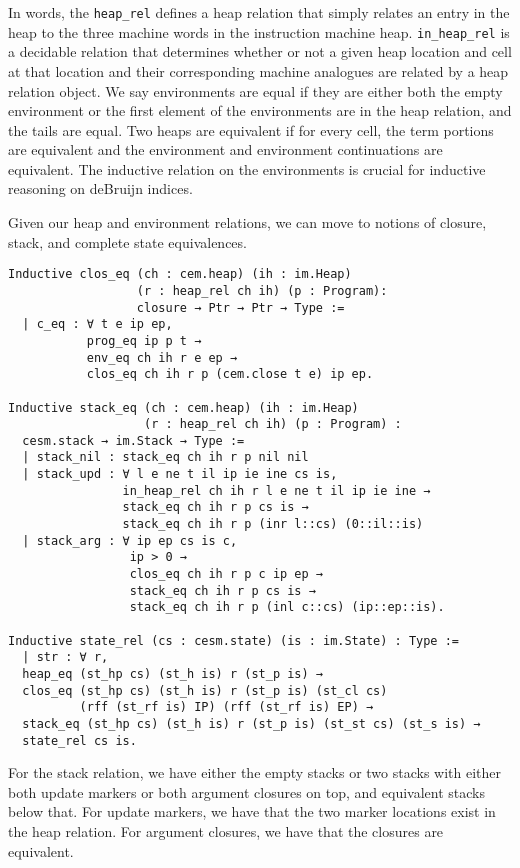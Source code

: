 In words, the \texttt{heap\_rel} defines a heap relation that simply relates an
entry in the \ce heap to the three machine words in the instruction machine
heap. \texttt{in\_heap\_rel} is a decidable relation that determines whether or
not a given heap location and cell at that location and their corresponding
machine analogues are related by a heap relation object. We say environments are
equal if they are either both the empty environment or the first element of the
environments are in the heap relation, and the tails are equal. Two heaps are
equivalent if for every cell, the term portions are equivalent and the
environment and environment continuations are equivalent. The inductive relation
on the environments is crucial for inductive reasoning on deBruijn indices.

Given our heap and environment relations, we can move to notions of closure,
stack, and complete state equivalences.

\begin{verbatim}
Inductive clos_eq (ch : cem.heap) (ih : im.Heap) 
                  (r : heap_rel ch ih) (p : Program):
                  closure → Ptr → Ptr → Type :=
  | c_eq : ∀ t e ip ep, 
           prog_eq ip p t → 
           env_eq ch ih r e ep →
           clos_eq ch ih r p (cem.close t e) ip ep. 

Inductive stack_eq (ch : cem.heap) (ih : im.Heap) 
                   (r : heap_rel ch ih) (p : Program) : 
  cesm.stack → im.Stack → Type := 
  | stack_nil : stack_eq ch ih r p nil nil
  | stack_upd : ∀ l e ne t il ip ie ine cs is, 
                in_heap_rel ch ih r l e ne t il ip ie ine →
                stack_eq ch ih r p cs is →
                stack_eq ch ih r p (inr l::cs) (0::il::is)
  | stack_arg : ∀ ip ep cs is c, 
                 ip > 0 →
                 clos_eq ch ih r p c ip ep →
                 stack_eq ch ih r p cs is → 
                 stack_eq ch ih r p (inl c::cs) (ip::ep::is).

Inductive state_rel (cs : cesm.state) (is : im.State) : Type := 
  | str : ∀ r, 
  heap_eq (st_hp cs) (st_h is) r (st_p is) →
  clos_eq (st_hp cs) (st_h is) r (st_p is) (st_cl cs) 
          (rff (st_rf is) IP) (rff (st_rf is) EP) →
  stack_eq (st_hp cs) (st_h is) r (st_p is) (st_st cs) (st_s is) →
  state_rel cs is.
\end{verbatim}
For the stack relation, we have either the empty stacks or two stacks with
either both update markers or both argument closures on top, and equivalent
stacks below that. For update markers, we have that the two marker locations
exist in the heap relation. For argument closures, we have that the closures are
equivalent. 

